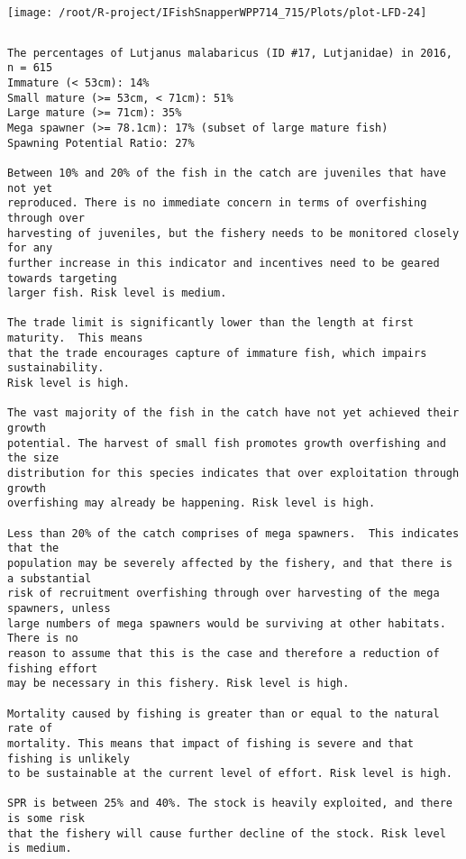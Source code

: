 \documentclass{report}\usepackage[]{graphicx}\usepackage[]{color}
\makeatletter
\def\maxwidth{ %
  \ifdim\Gin@nat@width>\linewidth
    \linewidth
  \else
    \Gin@nat@width
  \fi
}
\newenvironment{kframe}{%
 \def\at@end@of@kframe{}%
 \ifinner\ifhmode%
  \def\at@end@of@kframe{\end{minipage}}%
  \begin{minipage}{\columnwidth}%
 \fi\fi%
 \def\FrameCommand##1{\hskip\@totalleftmargin \hskip-\fboxsep
 \colorbox{shadecolor}{##1}\hskip-\fboxsep
     \hskip-\linewidth \hskip-\@totalleftmargin \hskip\columnwidth}%
 \MakeFramed {\advance\hsize-\width
   \@totalleftmargin\z@ \linewidth\hsize
   \@setminipage}}%
 {\par\unskip\endMakeFramed%
 \at@end@of@kframe}
\newenvironment{knitrout}{}{} %
\makeatother
\begin{document}
\begin{knitrout}
\texttt{[image: /root/R-project/IFishSnapperWPP714\_715/Plots/plot-LFD-24]} 
\begin{kframe}\begin{verbatim}
\end{verbatim}
\end{kframe}
\clearpage
\newpage
\begin{kframe}\begin{verbatim}The percentages of Lutjanus malabaricus (ID #17, Lutjanidae) in 2016, n = 615
Immature (< 53cm): 14%
Small mature (>= 53cm, < 71cm): 51%
Large mature (>= 71cm): 35%
Mega spawner (>= 78.1cm): 17% (subset of large mature fish)
Spawning Potential Ratio: 27%
 
Between 10% and 20% of the fish in the catch are juveniles that have not yet
reproduced. There is no immediate concern in terms of overfishing through over
harvesting of juveniles, but the fishery needs to be monitored closely for any
further increase in this indicator and incentives need to be geared towards targeting
larger fish. Risk level is medium.

The trade limit is significantly lower than the length at first maturity.  This means
that the trade encourages capture of immature fish, which impairs sustainability.
Risk level is high.

The vast majority of the fish in the catch have not yet achieved their growth
potential. The harvest of small fish promotes growth overfishing and the size
distribution for this species indicates that over exploitation through growth
overfishing may already be happening. Risk level is high.

Less than 20% of the catch comprises of mega spawners.  This indicates that the
population may be severely affected by the fishery, and that there is a substantial
risk of recruitment overfishing through over harvesting of the mega spawners, unless
large numbers of mega spawners would be surviving at other habitats. There is no
reason to assume that this is the case and therefore a reduction of fishing effort
may be necessary in this fishery. Risk level is high.
 
Mortality caused by fishing is greater than or equal to the natural rate of
mortality. This means that impact of fishing is severe and that fishing is unlikely
to be sustainable at the current level of effort. Risk level is high.
 
SPR is between 25% and 40%. The stock is heavily exploited, and there is some risk
that the fishery will cause further decline of the stock. Risk level is medium.
 

\end{verbatim}
\end{kframe}
\end{knitrout}
\end{document}
